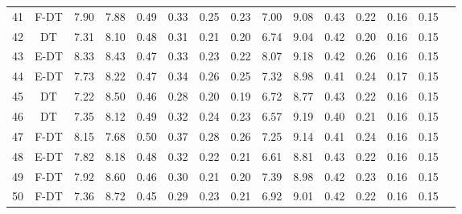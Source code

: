 \begin{longtable}{@{\hskip3pt}c@{\hskip3pt}c@{\hskip3pt}c@{\hskip3pt}c@{\hskip3pt}c@{\hskip3pt}c@{\hskip3pt}c@{\hskip3pt}c@{\hskip3pt}c@{\hskip3pt}c@{\hskip3pt}c@{\hskip3pt}c@{\hskip3pt}c@{\hskip3pt}c@{\hskip3pt}c}
         41 &           F-DT &              7.90 &        7.88 &          0.49 &        0.33 &        0.25 &         0.23 &                7.00 &        9.08 &          0.43 &        0.22 &        0.16 &         0.15 \\
         42 &             DT &              7.31 &        8.10 &          0.48 &        0.31 &        0.21 &         0.20 &                6.74 &        9.04 &          0.42 &        0.20 &        0.16 &         0.15 \\
         43 &           E-DT &              8.33 &        8.43 &          0.47 &        0.33 &        0.23 &         0.22 &                8.07 &        9.18 &          0.42 &        0.26 &        0.16 &         0.15 \\
         44 &           E-DT &              7.73 &        8.22 &          0.47 &        0.34 &        0.26 &         0.25 &                7.32 &        8.98 &          0.41 &        0.24 &        0.17 &         0.15 \\
         45 &             DT &              7.22 &        8.50 &          0.46 &        0.28 &        0.20 &         0.19 &                6.72 &        8.77 &          0.43 &        0.22 &        0.16 &         0.15 \\
         46 &             DT &              7.35 &        8.12 &          0.49 &        0.32 &        0.24 &         0.23 &                6.57 &        9.19 &          0.40 &        0.21 &        0.16 &         0.15 \\
         47 &           F-DT &              8.15 &        7.68 &          0.50 &        0.37 &        0.28 &         0.26 &                7.25 &        9.14 &          0.41 &        0.24 &        0.16 &         0.15 \\
         48 &           E-DT &              7.82 &        8.18 &          0.48 &        0.32 &        0.22 &         0.21 &                6.61 &        8.81 &          0.43 &        0.22 &        0.16 &         0.15 \\
         49 &           F-DT &              7.92 &        8.60 &          0.46 &        0.30 &        0.21 &         0.20 &                7.39 &        8.98 &          0.42 &        0.23 &        0.16 &         0.15 \\
         50 &           F-DT &              7.36 &        8.72 &          0.45 &        0.29 &        0.23 &         0.21 &                6.92 &        9.01 &          0.42 &        0.22 &        0.16 &         0.15 \\

\end{longtable}

